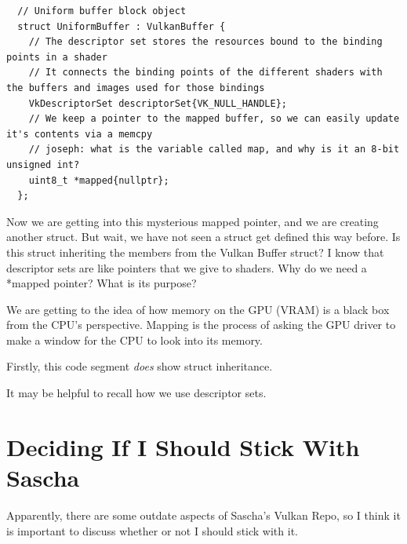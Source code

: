 \documentclass{article}
\begin{document}
\begin{verbatim}
  // Uniform buffer block object
  struct UniformBuffer : VulkanBuffer {
    // The descriptor set stores the resources bound to the binding points in a shader
    // It connects the binding points of the different shaders with the buffers and images used for those bindings
    VkDescriptorSet descriptorSet{VK_NULL_HANDLE};
    // We keep a pointer to the mapped buffer, so we can easily update it's contents via a memcpy
    // joseph: what is the variable called map, and why is it an 8-bit unsigned int?
    uint8_t *mapped{nullptr};
  };
\end{verbatim}
\begin{tcolorbox}[
  enhanced,
  breakable,
  colback=orange!5,
  colframe=orange!75!black,
  sharp corners=all,
  boxrule=0.8pt,
  left=5pt,
  right=5pt,
  top=6pt,
  bottom=6pt,
  parbox=false
]
\par Now we are getting into this mysterious mapped pointer, and
we are creating another struct. But wait, we have not seen a struct
get defined this way before. Is this struct inheriting the members
from the Vulkan Buffer struct? I know that descriptor sets are like
pointers that we give to shaders. Why do we need a *mapped pointer?
What is its purpose?
\end{tcolorbox}

\begin{tcolorbox}[
  enhanced,
  breakable,
  colback=green!5,
  colframe=green!45!black,
  sharp corners=all,
  boxrule=0.8pt,
  left=5pt,
  right=5pt,
  top=6pt,
  bottom=6pt,
  parbox=false
]
\par We are getting to the idea of how memory on the GPU (VRAM) is
a black box from the CPU's perspective. Mapping is the process of
asking the GPU driver to make a window for the CPU to look into its memory.

\par Firstly, this code segment \textit{does} show struct inheritance.

\par It may be helpful to recall how we use descriptor sets.
\end{tcolorbox}

\section*{Deciding If I Should Stick With
Sascha}
\par Apparently, there are some outdate aspects of Sascha's Vulkan
Repo, so I think it is important to discuss whether or not I should
stick with it.
\end{document}

